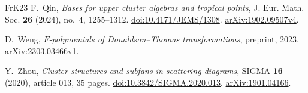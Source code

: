 \documentclass[11pt]{amsart}
\numberwithin{equation}{section}
\theoremstyle{definition}
\theoremstyle{remark}
\begin{document}
\begin{thebibliography}{FrK23}
F.~Qin, \emph{Bases for upper cluster algebras and tropical points},
J. Eur. Math. Soc. \textbf{26} (2024), no.~4, 1255--1312.
\href{https://doi.org/10.4171/JEMS/1308}{doi:10.4171/JEMS/1308}.
\href{https://arxiv.org/abs/1902.09507v4}{arXiv:1902.09507v4}.

D.~Weng, \emph{$F$-polynomials of Donaldson--Thomas transformations},
preprint, 2023.
\href{https://arxiv.org/abs/2303.03466v1}{arXiv:2303.03466v1}.

Y.~Zhou, \emph{Cluster structures and subfans in scattering diagrams},
SIGMA \textbf{16} (2020), article 013, 35 pages.
\href{https://doi.org/10.3842/SIGMA.2020.013}{doi:10.3842/SIGMA.2020.013}.
\href{https://arxiv.org/abs/1901.04166}{arXiv:1901.04166}.

\end{thebibliography}
\end{document}
